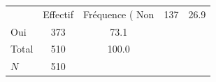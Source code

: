 {
\def\sym#1{\ifmmode^{#1}\else\(^{#1}\)\fi}
\begin{tabular}{l*{1}{cc}}
\toprule
            &    Effectif&Fréquence (%
\midrule
Non         &         137&        26.9\\
Oui         &         373&        73.1\\
Total       &         510&       100.0\\
\midrule
\(N\)       &         510&            \\
\bottomrule
\end{tabular}
}
